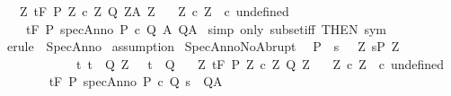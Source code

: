 \begin{isabellebody}
\ \ \ {\isasymforall}Z{\isachardot}\ {\isasymGamma}{\isacharcomma}{\isasymTheta}{\isasymturnstile}\isactrlsub t\isactrlbsub {\isacharslash}F\isactrlesub \ {\isacharparenleft}P{\isacharprime}\ Z{\isacharparenright}\ {\isacharparenleft}c\ Z{\isacharparenright}\ {\isacharparenleft}Q{\isacharprime}\ Z{\isacharparenright}{\isacharcomma}{\isacharparenleft}A{\isacharprime}\ Z{\isacharparenright}{\isacharsemicolon}\isanewline
\ \ \ {\isasymforall}Z{\isachardot}\ c\ Z\ {\isacharequal}\ c\ undefined\isanewline
\ \ {\isasymrbrakk}\ {\isasymLongrightarrow}\isanewline
\ \ \ \ {\isasymGamma}{\isacharcomma}{\isasymTheta}{\isasymturnstile}\isactrlsub t\isactrlbsub {\isacharslash}F\isactrlesub \ P\ {\isacharparenleft}specAnno\ P{\isacharprime}\ c\ Q{\isacharprime}\ A{\isacharprime}{\isacharparenright}\ Q{\isacharcomma}A{\isachardoublequoteclose}\isanewline
%
\isadelimproof
%
\endisadelimproof
%
\isatagproof
{}\isamarkupfalse%
\ {\isacharparenleft}simp\ only{\isacharcolon}\ subset{\isacharunderscore}iff\ {\isacharbrackleft}THEN\ sym{\isacharbrackright}{\isacharparenright}\isanewline
{}\isamarkupfalse%
\ {\isacharparenleft}erule\ {\isacharparenleft}{}{\isacharparenright}\ SpecAnno{\isacharparenright}\isanewline
{}\isamarkupfalse%
\ assumption\isanewline
{}\isamarkupfalse%
%
\endisatagproof
{\isafoldproof}%
%
\isadelimproof
\isanewline
%
\endisadelimproof
\isanewline
{}\isamarkupfalse%
\ SpecAnnoNoAbrupt{\isacharcolon}\ \isanewline
\ {\isachardoublequoteopen}{\isasymlbrakk}P\ {\isasymsubseteq}\ {\isacharbraceleft}s{\isachardot}\ \ {\isasymexists}\ Z{\isachardot}\ s{\isasymin}P{\isacharprime}\ Z\ {\isasymand}\ \isanewline
\ \ \ \ \ \ \ \ \ \ \ \ {\isacharparenleft}{\isasymforall}t{\isachardot}\ t\ {\isasymin}\ Q{\isacharprime}\ Z\ {\isasymlongrightarrow}\ \ t\ {\isasymin}\ Q{\isacharparenright}{\isacharbraceright}{\isacharsemicolon}\isanewline
\ \ \ {\isasymforall}Z{\isachardot}\ {\isasymGamma}{\isacharcomma}{\isasymTheta}{\isasymturnstile}\isactrlsub t\isactrlbsub {\isacharslash}F\isactrlesub \ {\isacharparenleft}P{\isacharprime}\ Z{\isacharparenright}\ {\isacharparenleft}c\ Z{\isacharparenright}\ {\isacharparenleft}Q{\isacharprime}\ Z{\isacharparenright}{\isacharcomma}{\isacharbraceleft}{\isacharbraceright}{\isacharsemicolon}\isanewline
\ \ \ {\isasymforall}Z{\isachardot}\ c\ Z\ {\isacharequal}\ c\ undefined\isanewline
\ \ {\isasymrbrakk}\ {\isasymLongrightarrow}\isanewline
\ \ \ \ {\isasymGamma}{\isacharcomma}{\isasymTheta}{\isasymturnstile}\isactrlsub t\isactrlbsub {\isacharslash}F\isactrlesub \ P\ {\isacharparenleft}specAnno\ P{\isacharprime}\ c\ Q{\isacharprime}\ {\isacharparenleft}{\isasymlambda}s{\isachardot}\ {\isacharbraceleft}{\isacharbraceright}{\isacharparenright}{\isacharparenright}\ Q{\isacharcomma}A{\isachardoublequoteclose}\isanewline

\end{isabellebody}
